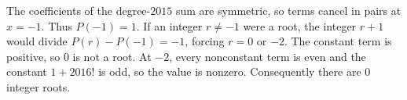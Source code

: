 The coefficients of the degree-$2015$ sum are symmetric, so terms cancel in pairs at $x=-1$. Thus $P(-1)=1$. If an integer $r\ne-1$ were a root, the integer $r+1$ would divide $P(r)-P(-1)=-1$, forcing $r=0$ or $-2$. The constant term is positive, so $0$ is not a root. At $-2$, every nonconstant term is even and the constant $1+2016!$ is odd, so the value is nonzero. Consequently there are $\boxed0$ integer roots.
